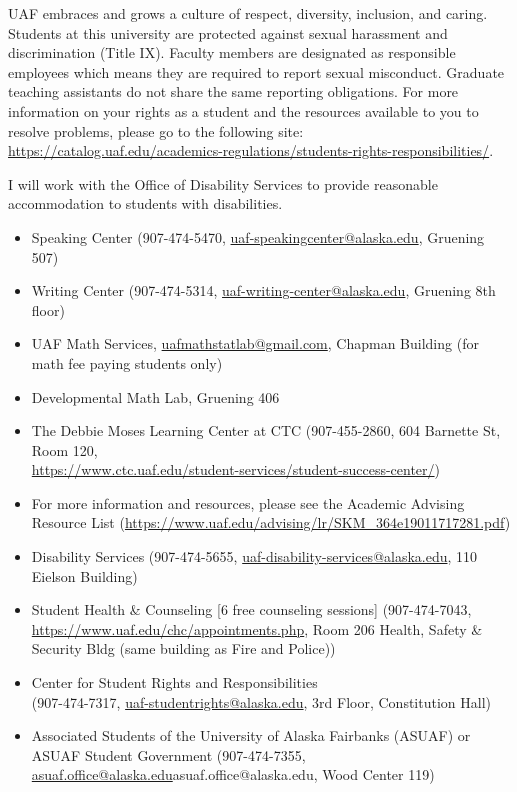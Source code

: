 \documentclass[11pt]{article}
\def\mailto#1{\href{mailto:#1}{#1}}
\begin{document}
 UAF embraces and grows a culture of respect, diversity, inclusion, and caring. Students at this university are protected against sexual harassment and discrimination (Title IX). Faculty members are designated as responsible employees which means they are required to report sexual misconduct. Graduate teaching assistants do not share the same reporting obligations. For more information on your rights as a student and the resources available to you to resolve problems, please go to the following site: \\
\url{https://catalog.uaf.edu/academics-regulations/students-rights-responsibilities/}.

 I will work with the Office of Disability Services to provide reasonable accommodation to students with disabilities.

\begin{itemize}
\setlength\itemsep{0em}
        \item Speaking Center (907-474-5470,
        \mailto{uaf-speakingcenter@alaska.edu}, Gruening 507)
\item Writing Center (907-474-5314, \mailto{uaf-writing-center@alaska.edu}, Gruening 8th floor)
\item UAF Math Services, \mailto{uafmathstatlab@gmail.com}, Chapman Building (for math fee paying students only)
\item Developmental Math Lab, Gruening 406
\item The Debbie Moses Learning Center at CTC (907-455-2860, 604 Barnette St, Room 120,\\ \mailto{https://www.ctc.uaf.edu/student-services/student-success-center/})
\item For more information and resources, please see the Academic Advising Resource List (\url{https://www.uaf.edu/advising/lr/SKM_364e19011717281.pdf})
\end{itemize}

\begin{itemize}
\setlength\itemsep{0em}
\item Disability Services (907-474-5655, \mailto{uaf-disability-services@alaska.edu}, 110 Eielson Building)
\item Student Health \& Counseling [6 free counseling sessions] (907-474-7043, \url{https://www.uaf.edu/chc/appointments.php}, Room 206 Health, Safety \& Security Bldg (same building as Fire and Police))
\item Center for Student Rights and Responsibilities \\(907-474-7317, \mailto{uaf-studentrights@alaska.edu}, 3rd Floor, Constitution Hall)
\item Associated Students of the University of Alaska Fairbanks (ASUAF) or ASUAF Student Government (907-474-7355, \mailto{asuaf.office@alaska.edu}{asuaf.office@alaska.edu}, Wood Center 119)
\end{itemize}
\end{document}
